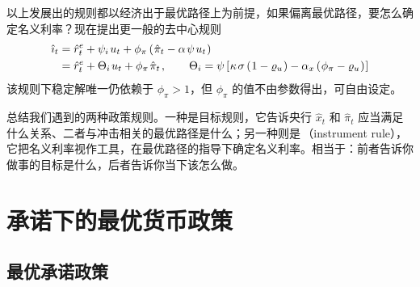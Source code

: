 以上发展出的规则都以经济出于最优路径上为前提，如果偏离最优路径，要怎么确定名义利率？现在提出更一般的去中心规则
\begin{align*}
    \hat \imath_t &= \hat r_t^e +\psi_i\,u_t+\phi_\pi\bka{\hat\pi_t-\alpha\,\psi\,u_t}\\
    &= \hat r_t^e + \Theta_i\,u_t + \phi_\pi\,\hat\pi_t\,,\qquad \Theta_i=\psi\bks{\kappa\,\sigma\bka{1-\varrho_u}-\alpha_x\bka{\phi_\pi-\varrho_u}}
\end{align*}
该规则下稳定解唯一仍依赖于 \(\phi_\pi>1\)，但 \(\phi_\pi\) 的值不由参数得出，可自由设定。

总结我们遇到的两种政策规则。一种是目标规则，它告诉央行 \(\hat x_t\) 和 \(\hat\pi_t\) 应当满足什么关系、二者与冲击相关的最优路径是什么；另一种则是\,（instrument rule），它把名义利率视作工具，在最优路径的指导下确定名义利率。相当于：前者告诉你做事的目标是什么，后者告诉你当下该怎么做。

\section{承诺下的最优货币政策}

\subsection{最优承诺政策}

